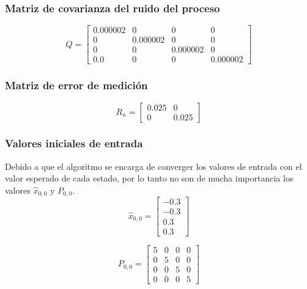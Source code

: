 		\subsubsection*{Matriz de covarianza del ruido del proceso}
\begin{equation}
Q = \begin{bmatrix}
0.000002 & 0 & 0 & 0\\ 
0        & 0.000002 & 0        & 0\\ 
0        & 0        & 0.000002 & 0\\ 
0.0      & 0        & 0        & 0.000002
\end{bmatrix}
\label{eq:process_noise_matrix}
\end{equation}

		\subsubsection*{Matriz de error de medición}
\begin{equation}
R_n = \begin{bmatrix}
0.025 & 0\\ 
0     & 0.025
\end{bmatrix}
\label{eq:noise_measurement}
\end{equation}

		\subsubsection*{Valores iniciales de entrada}
		Debido a que el algoritmo se encarga de converger los valores de entrada con el valor esperado de cada estado, por lo tanto no son de mucha importancia los valores $\hat{x}_{0,0}$ y $P_{0,0}$.
\begin{equation}
\hat{x}_{0,0} = \begin{bmatrix}
-0.3\\ 
-0.3\\ 
0.3\\ 
0.3
\end{bmatrix}
\label{eq:initial_state_vector}
\end{equation}

\begin{equation}
P_{0,0} 
=
\begin{bmatrix}
5   & 0 & 0 & 0\\ 
0   & 5 & 0 & 0\\
0   & 0 & 5 & 0\\
0   & 0 & 0 & 5
\end{bmatrix}
\label{eq:initial_cov_vector}
\end{equation}	

